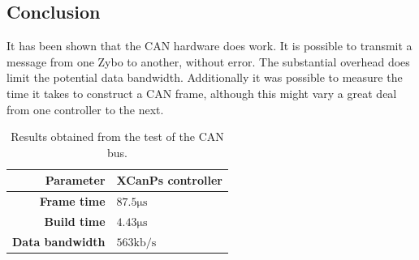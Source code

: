 \subsection{Conclusion}\label{sub:CAN_test_conclusion}
It has been shown that the CAN hardware does work.
It is possible to transmit a message from one Zybo to another, without error.
The substantial overhead does limit the potential data bandwidth.
Additionally it was possible to measure the time it takes to construct a CAN frame, although this might vary a great deal from one controller to the next.

\begin{table}[h!]
	\centering
	\begin{tabular}{r | l }
		\textbf{Parameter} & \textbf{XCanPs controller}  \\
		\hline
		\textbf{Frame time} & $87.5 \si{\micro\second}$\\
		\textbf{Build time} & $4.43 \si{\micro\second}$  \\
		\textbf{Data bandwidth} & $563 \mathrm{kb/s}$
	\end{tabular}
	\caption{Results obtained from the test of the CAN bus.}
	\label{tab:CAN_test_conclusion}
\end{table}

